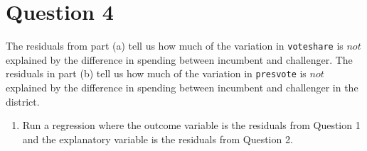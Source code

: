 \documentclass[12pt,letterpaper]{article}
\begin{document}
\section*{Question 4}
\noindent The residuals from part (a) tell us how much of the variation in \texttt{voteshare} is $not$ explained by the difference in spending between incumbent and challenger. The residuals in part (b) tell us how much of the variation in \texttt{presvote} is $not$ explained by the difference in spending between incumbent and challenger in the district.
\begin{enumerate}
	\item Run a regression where the outcome variable is the residuals from Question 1 and the explanatory variable is the residuals from Question 2.	
	
	

\end{enumerate}
\end{document}
